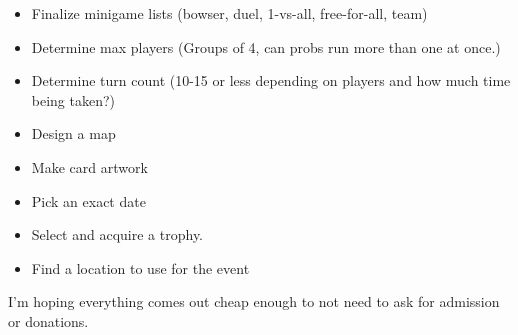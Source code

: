 \documentclass{article}
\begin{document}
\begin{itemize}
\item Finalize minigame lists (bowser, duel, 1-vs-all, free-for-all, team)
\item Determine max players (Groups of 4, can probs run more than one at once.)
\item Determine turn count (10-15 or less depending on players and how much time being taken?)
\item Design a map
\item Make card artwork
\item Pick an exact date
\item Select and acquire a trophy.
\item Find a location to use for the event
\end{itemize}
\vspace*{2ex}

\noindent
I'm hoping everything comes out cheap enough to not need to ask for admission or donations.
\end{document}
